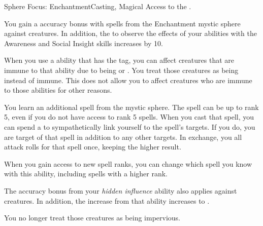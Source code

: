   \begin{magicalfeat}{Sphere Focus: Enchantment}{Casting, Magical}
    \featpre Access to the  .

     You gain a  accuracy bonus with spells from the Enchantment mystic sphere against \unaware creatures.
    In addition, the  to observe the effects of your  abilities with the Awareness and Social Insight skills increases by 10.

     When you use a \magical ability that has the  tag, you can affect creatures that are immune to that ability due to being  or .
    You treat those creatures as being \impervious instead of immune.
    This does not allow you to affect creatures who are immune to those abilities for other reasons.

     You learn an additional  spell from the  mystic sphere.
    The spell can be up to rank 5, even if you do not have access to rank 5 spells.
    When you cast that spell, you can spend a  to sympathetically link yourself to the spell's targets.
    If you do, you are target of that spell in addition to any other targets.
    In exchange, you  all attack rolls for that spell once, keeping the higher result.

    When you gain access to new spell ranks, you can change which spell you know with this ability, including spells with a higher rank.

     The accuracy bonus from your \textit{hidden influence} ability also applies against \partiallyunaware creatures.
    In addition, the  increase from that ability increases to .

     You no longer treat those creatures as being impervious.
  \end{magicalfeat}

